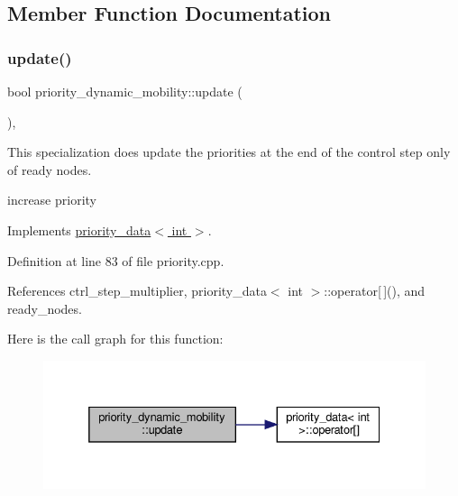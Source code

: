 \subsection{Member Function Documentation}
\mbox{\label{structpriority__dynamic__mobility_ab736af2d0bd541a8e53e37835900b061}} 
\subsubsection{\texorpdfstring{update()}{update()}}
{\footnotesize\ttfamily bool priority\+\_\+dynamic\+\_\+mobility\+::update (\begin{DoxyParamCaption}{ }\end{DoxyParamCaption})\hspace{0.3cm}{\ttfamily [override]}, {\ttfamily [virtual]}}



This specialization does update the priorities at the end of the control step only of ready nodes. 

increase priority 

Implements \hyperlink{structpriority__data_a3cd70f3b6d8e300615ad91fd85291c76}{priority\+\_\+data$<$ int $>$}.



Definition at line 83 of file priority.\+cpp.



References ctrl\+\_\+step\+\_\+multiplier, priority\+\_\+data$<$ int $>$\+::operator\mbox{[}$\,$\mbox{]}(), and ready\+\_\+nodes.

Here is the call graph for this function\+:
\nopagebreak
\begin{figure}[H]
\begin{center}
\leavevmode
\includegraphics[width=332pt]{da/dda/structpriority__dynamic__mobility_ab736af2d0bd541a8e53e37835900b061_cgraph}
\end{center}
\end{figure}


